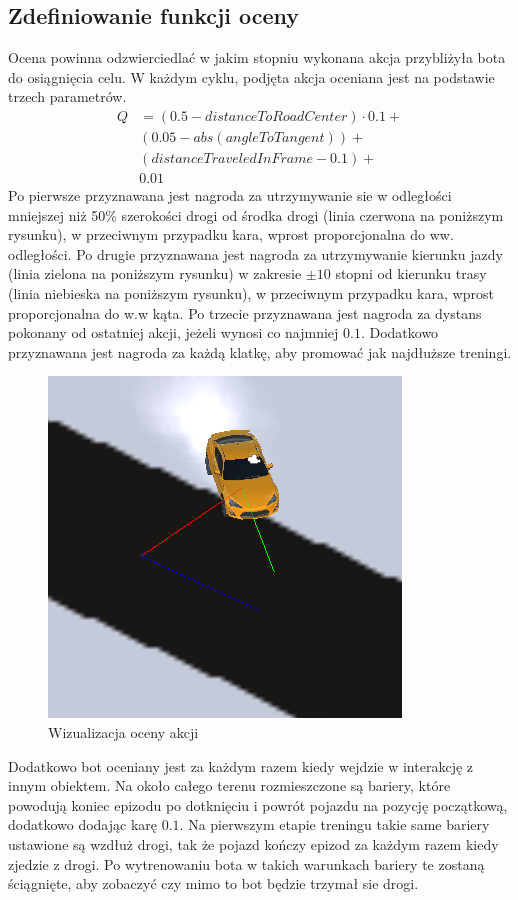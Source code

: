 \subsection{Zdefiniowanie funkcji oceny}
Ocena powinna odzwierciedlać w jakim stopniu wykonana akcja przybliżyła bota do osiągnięcia celu. W każdym cyklu, podjęta akcja oceniana jest na podstawie trzech parametrów.
\begin{align*}
    Q &= (0.5 - distanceToRoadCenter) \cdot 0.1 + \\
    & (0.05 - abs(angleToTangent)) + \\
    & (distanceTraveledInFrame - 0.1) + \\
    & 0.01
\end{align*}
Po pierwsze przyznawana jest nagroda za utrzymywanie sie w odległości mniejszej niż 50\% szerokości drogi od środka drogi (linia czerwona na poniższym rysunku), w przeciwnym przypadku kara, wprost proporcjonalna do ww. odległości. Po drugie przyznawana jest nagroda za utrzymywanie kierunku jazdy (linia zielona na poniższym rysunku) w zakresie $\pm10$ stopni od kierunku trasy (linia niebieska na poniższym rysunku), w przeciwnym przypadku kara, wprost proporcjonalna do w.w kąta. Po trzecie przyznawana jest nagroda za dystans pokonany od ostatniej akcji, jeżeli wynosi co najmniej $0.1$. Dodatkowo przyznawana jest nagroda za każdą klatkę, aby promować jak najdłuższe treningi.
\begin{figure}[H]
    \centering
    \includegraphics[width=.5\textwidth]{figures/rewards}
    \caption{Wizualizacja oceny akcji}
    \label{fig}
\end{figure}
Dodatkowo bot oceniany jest za każdym razem kiedy wejdzie w interakcję z innym obiektem. Na około całego terenu rozmieszczone są bariery, które powodują koniec epizodu po dotknięciu i powrót pojazdu na pozycję początkową, dodatkowo dodając karę $0.1$. Na pierwszym etapie treningu takie same bariery ustawione są wzdłuż drogi, tak że pojazd kończy epizod za każdym razem kiedy zjedzie z drogi. Po wytrenowaniu bota w takich warunkach bariery te zostaną ściągnięte, aby zobaczyć czy mimo to bot będzie trzymał sie drogi.\\
